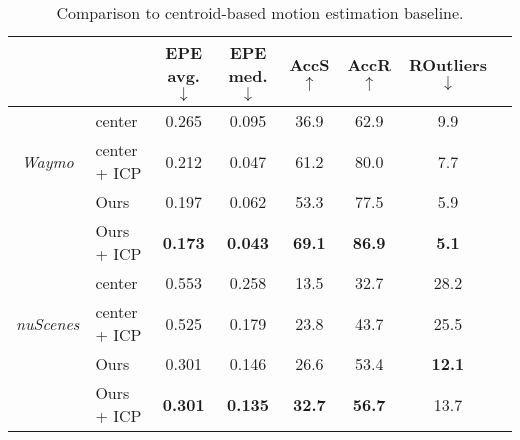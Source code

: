 \begin{table}[t]
    \setlength{\tabcolsep}{6pt}
    \renewcommand{\arraystretch}{1.2}
	\centering
    \begin{tabular}{clcccccc}
    \toprule
   &  & EPE avg.$\downarrow$ & EPE med.$\downarrow$ & AccS$\uparrow$ & AccR$\uparrow$ & ROutliers$\downarrow$   \\
   \midrule
    \multirow{3}{*}{\emph{Waymo}} & center & 0.265 & 0.095 & 36.9 & 62.9 & 9.9\\ 
    & center + ICP  & 0.212 & 0.047 & 61.2 & 80.0 & 7.7 \\
    & Ours   & 0.197 & 0.062 & 53.3 & 77.5 & 5.9 \\
    & Ours + ICP   & \textbf{0.173} & \textbf{0.043} & \textbf{69.1} & \textbf{86.9} & \textbf{5.1}\\
    \midrule
    \multirow{3}{*}{\emph{nuScenes}} & center & 0.553 & 0.258 & 13.5 & 32.7 & 28.2     \\ 
    & center + ICP   & 0.525 & 0.179 & 23.8 & 43.7 & 25.5\\
    & Ours   & 0.301 & 0.146 & 26.6 & 53.4 & \textbf{12.1}    \\
    & Ours + ICP   & \textbf{0.301} & \textbf{0.135} & \textbf{32.7} & \textbf{56.7} & 13.7 \\
    \bottomrule
    \end{tabular}
	\caption{Comparison to centroid-based motion estimation baseline.}
	\label{tab:tubenet_comparison}
\end{table}